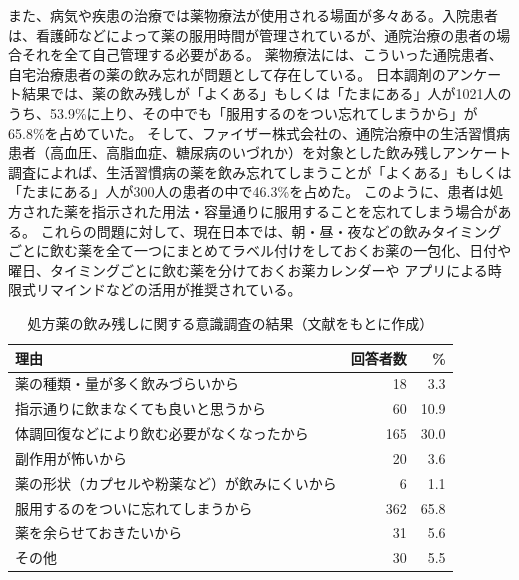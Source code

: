 また、病気や疾患の治療では薬物療法が使用される場面が多々ある。入院患者は、看護師などによって薬の服用時間が管理されているが、通院治療の患者の場合それを全て自己管理する必要がある。
薬物療法には、こういった通院患者、自宅治療患者の薬の飲み忘れが問題として存在している。\cite{hokkaido_mc_forget_medicine} \cite{drug_treatment_investigation} \cite{jp_mc_forget_medicine}
日本調剤のアンケート結果では、薬の飲み残しが「よくある」もしくは「たまにある」人が1021人のうち、53.9\%に上り、その中でも「服用するのをつい忘れてしまうから」が65.8\%を占めていた。\cite{jp_mc_forget_medicine}
そして、ファイザー株式会社の、通院治療中の生活習慣病患者（高血圧、高脂血症、糖尿病のいづれか）を対象とした飲み残しアンケート調査によれば、生活習慣病の薬を飲み忘れてしまうことが「よくある」もしくは「たまにある」人が300人の患者の中で46.3\%を占めた。
このように、患者は処方された薬を指示された用法・容量通りに服用することを忘れてしまう場合がある。
これらの問題に対して、現在日本では、朝・昼・夜などの飲みタイミングごとに飲む薬を全て一つにまとめてラベル付けをしておくお薬の一包化、日付や曜日、タイミングごとに飲む薬を分けておくお薬カレンダーや
アプリによる時限式リマインドなどの活用が推奨されている。\cite{jp_mc_countermeasure}

\begin{table}[htbp]
  \caption{処方薬の飲み残しに関する意識調査の結果（文献\cite{jp_mc_forget_medicine}をもとに作成）}
  \label{tbl:forget_medicine_number}
  \begin{center}
    \begin{tabular}{|l||r||r|}
      \hline
      理由  & 回答者数 & \% \\
      \hline\hline
      薬の種類・量が多く飲みづらいから  & 18 & 3.3 \\\hline
      指示通りに飲まなくても良いと思うから  & 60 & 10.9 \\\hline
      体調回復などにより飲む必要がなくなったから  & 165 & 30.0 \\\hline
      副作用が怖いから  & 20 & 3.6 \\\hline
      薬の形状（カプセルや粉薬など）が飲みにくいから  & 6 & 1.1 \\\hline
      服用するのをついに忘れてしまうから  & 362 & 65.8 \\\hline
      薬を余らせておきたいから  & 31 & 5.6 \\\hline
      その他  & 30 & 5.5 \\\hline
    \end{tabular}
  \end{center}
\end{table}

